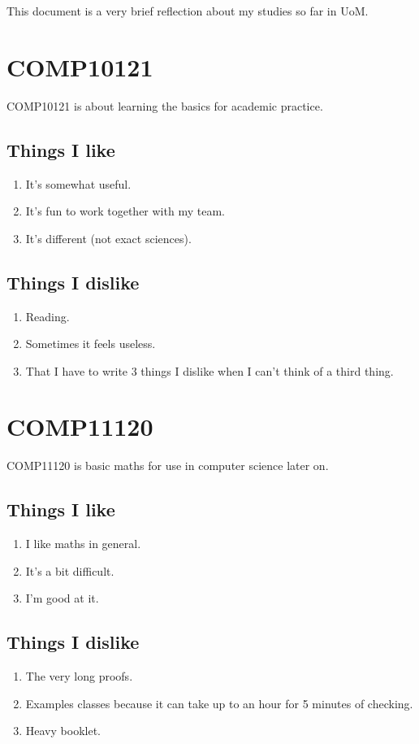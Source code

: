 \documentclass[a4paper]{article}
\begin{document}
\tableofcontents
\newpage

This document is a very brief reflection about my studies so far in UoM.

\section{COMP10121}
COMP10121 is about learning the basics for academic practice.
\subsection{Things I like}
\begin{enumerate}
\item{It's somewhat useful.}
\item{It's fun to work together with my team.}
\item{It's different (not exact sciences).}
\end{enumerate}
\subsection{Things I dislike}
\begin{enumerate}
\item{Reading.}
\item{Sometimes it feels useless.}
\item{That I have to write 3 things I dislike when I can't think of a third thing.}
\end{enumerate}

\section{COMP11120}
COMP11120 is basic maths for use in computer science later on.
\subsection{Things I like}
\begin{enumerate}
\item{I like maths in general.}
\item{It's a bit difficult.}
\item{I'm good at it.}
\end{enumerate}
\subsection{Things I dislike}
\begin{enumerate}
\item{The very long proofs.}
\item{Examples classes because it can take up to an hour for 5 minutes of checking.}
\item{Heavy booklet.}
\end{enumerate}
\end{document}
